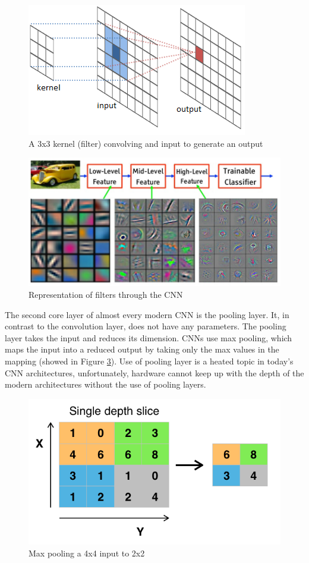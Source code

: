 \documentclass[times, utf8, diplomski]{fer}
\begin{document}
\begin{figure}
  \includegraphics{figures/conv1.png}
  \centering
  \caption{A 3x3 kernel (filter) convolving and input to generate an output}
  \label{fig:conv1}
\end{figure}

\begin{figure}
  \includegraphics[scale=1.4]{figures/filter.png}
  \centering
  \caption{Representation of filters through the CNN}
  \label{fig:filter}
\end{figure}

The second core layer of almost every modern CNN is the pooling layer. It, in contrast to the convolution layer, does not have any parameters. The pooling layer takes the input and reduces its dimension. CNNs use max pooling, which maps the input into a reduced output by taking only the max values in the mapping (showed in Figure \ref{fig:pool}). Use of pooling layer is a heated topic in today's CNN architectures, unfortunately, hardware cannot keep up with the depth of the modern architectures without the use of pooling layers.

\begin{figure}
  \includegraphics[scale=0.6]{figures/pool.png}
  \centering
  \caption{Max pooling a 4x4 input to 2x2}
  \label{fig:pool}
\end{figure}
\end{document}
